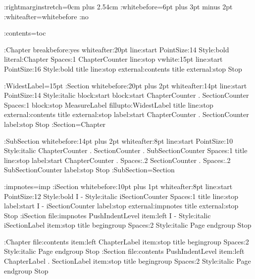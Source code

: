 %
\def\con#1{{\tt#1}}
\def\n#1{{\tt#1}}
\def\file#1{{\tt#1}}

\def\Lollipop{Lollipop}

\Distance:rightmarginstretch={0cm plus 2.54cm}
\Distance:whitebefore={6pt plus 3pt minus 2pt}
\Distance:whiteafter=whitebefore
\FlushRight:no

\DefineExternalFile:contents=toc

\DefineHeading:Chapter
    breakbefore:yes whiteafter:20pt
    line:start PointSize:14 Style:bold literal:Chapter 
        Spaces:1 ChapterCounter line:stop
    vwhite:15pt
    line:start PointSize:16 Style:bold title line:stop
    external:contents title external:stop
    Stop

\AdaptiveDistance:WidestLabel=15pt
\def\MeasureLabel{\ifdim\BlockWidth>\WidestLabel
    \global\WidestLabel\BlockWidth\fi}
\DefineHeading:Section
    whitebefore:{20pt plus 2pt} whiteafter:14pt
    line:start PointSize:14 Style:italic 
        block:start block:start ChapterCounter . SectionCounter
              Spaces:1 block:stop MeasureLabel
              fillupto:WidestLabel
        title line:stop
    external:contents title external:stop
    label:start ChapterCounter . SectionCounter label:stop
    Stop
\GoverningCounter:Section=Chapter

\DefineHeading:SubSection
    whitebefore:{14pt plus 2pt} whiteafter:8pt
    line:start PointSize:10 Style:italic 
        ChapterCounter . SectionCounter . SubSectionCounter 
        Spaces:1 title line:stop
    label:start ChapterCounter . Spaces:.2 SectionCounter 
        . Spaces:.2 SubSectionCounter label:stop
    Stop
\GoverningCounter:SubSection=Section

\DefineExternalFile:impnotes=imp
\DefineHeading:iSection
    whitebefore:{10pt plus 1pt} whiteafter:8pt
    line:start PointSize:12 Style:bold I - 
        Style:italic iSectionCounter
        Spaces:1 title line:stop
    label:start I - iSectionCounter label:stop
    external:impnotes title external:stop
    Stop
\DefineExternalItem:iSection file:impnotes PushIndentLevel
    item:left I - Style:italic iSectionLabel item:stop
    title begingroup Spaces:2 Style:italic Page endgroup
    Stop

\DefineExternalItem:Chapter file:contents
    item:left ChapterLabel item:stop
    title begingroup Spaces:2 Style:italic Page endgroup
    Stop
\DefineExternalItem:Section file:contents PushIndentLevel 
    item:left ChapterLabel . SectionLabel item:stop
    title begingroup Spaces:2 Style:italic Page endgroup
    Stop

